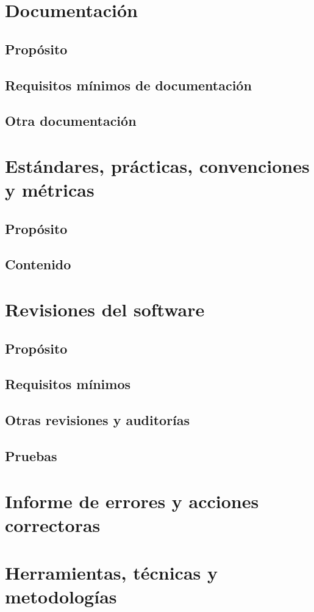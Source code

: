 \documentclass[11pt, a4paper, twoside, titlepage]{article}
\begin{document}
	\section{Documentación} %
		\subsection{Propósito} 
		\subsection{Requisitos mínimos de documentación} 
		\subsection{Otra documentación} 
	\section{Estándares, prácticas, convenciones y métricas}%
		\subsection{Propósito}
		\subsection{Contenido}
	\section{Revisiones del software}%
		\subsection{Propósito}
		\subsection{Requisitos mínimos}
		\subsection{Otras revisiones y auditorías}
		\subsection{Pruebas}
	\section{Informe de errores y acciones correctoras}%
	\section{Herramientas, técnicas y metodologías}%
\end{document}
